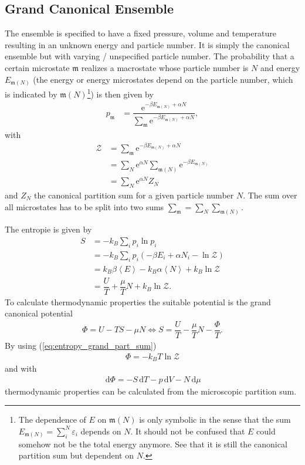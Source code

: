 \documentclass[a4paper,10pt]{article}
\newcommand{\td}{\,\text{d}}
\numberwithin{equation}{section}
\begin{document}
\begin{multicols}{2}
\subsection{Grand Canonical Ensemble}
The ensemble is specified to have a fixed pressure, volume and temperature resulting in an unknown energy and particle number.
It is simply the canonical ensemble but with varying / unspecified particle number.
The probability that a certain microstate $\mathfrak{m}$ realizes a macrostate whose particle number is $N$ and energy $E_{\mathfrak{m}(N)}$ (the energy or energy microstates depend on the particle number, which is indicated by $\mathfrak{m}(N)$\footnote{The dependence of $E$ on $\mathfrak{m}(N)$ is only symbolic in the sense that the sum $E_{\mathfrak{m}(N)}=\sum_{i}^{N}\varepsilon _i$ depends on $N$. 
It should not be confused that $E$ could somehow not be the total energy anymore.
See that it is still the canonical partition sum but dependent on $N$.}) is then given by
\begin{align} 
  p_\mathfrak{m} &= \dfrac{\text{e}^{-\beta E_{\mathfrak{m}(N)}+\alpha N}}{\sum_{\mathfrak{m}}^{}\text{e}^{-\beta E_{\mathfrak{m}(N)}+\alpha N}}
,\end{align} 
with
\begin{align} 
  \mathcal{Z} &= \sum_{\mathfrak{m}}^{}\text{e}^{-\beta E_{\mathfrak{m}(N)}+\alpha N}\\
              &= \sum_{N}^{}\text{e}^{\alpha N}\sum_{\mathfrak{m}(N)}^{}\text{e}^{-\beta E_{\mathfrak{m}(N)}}\\
              &= \sum_{N}^{}\text{e}^{\alpha N}Z_N
\end{align} 
and $Z_N$ the canonical partition sum for a given particle number $N$.
The sum over all microstates has to be split into two sums $\sum_{\mathfrak{m}}^{}=\sum_{N}^{}\sum_{\mathfrak{m}(N)}^{}$.

The entropie is given by
\begin{align} 
  S &= -k_B\sum_{i}^{}p_i\ln p_i\\
    &= -k_B\sum_{i}^{}p_i\left(-\beta E_i+\alpha N_i-\ln \mathcal{Z}\right)\\
    &= k_B\beta \left\langle E\right\rangle -k_B\alpha \left\langle N\right\rangle +k_B\ln\mathcal{Z}\\
    &= \dfrac{U}{T}+\dfrac{\mu }{T}N+k_B\ln\mathcal{Z} \label{eq:entropy_grand_part_sum}
.\end{align} 
To calculate thermodynamic properties the suitable potential is the grand canonical potential
\begin{align} 
  \Phi = U-TS-\mu N\Leftrightarrow S=\dfrac{U}{T}-\dfrac{\mu }{T}N-\dfrac{\Phi }{T}
.\end{align} 
By using (\ref{eq:entropy_grand_part_sum})
\begin{align} 
  \boxed{\Phi =-k_BT\ln\mathcal{Z}}
\end{align} 
and with
\begin{align} 
  \td \Phi =-S\td T-p\td V-N\td \mu 
\end{align} 
thermodynamic properties can be calculated from the microscopic partition sum.


\end{multicols}
\end{document}
